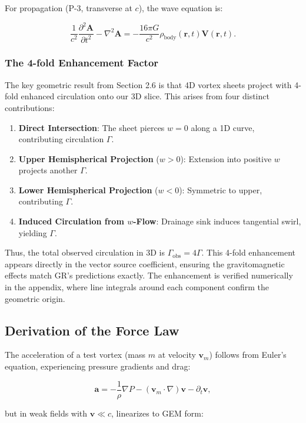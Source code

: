\documentclass{article}
\begin{document}
For propagation (P-3, transverse at \(c\)), the wave equation is:

\[
\frac{1}{c^2} \frac{\partial^2 \mathbf{A}}{\partial t^2} - \nabla^2 \mathbf{A} = -\frac{16\pi G}{c^2} \rho_{\text{body}}(\mathbf{r}, t) \mathbf{V}(\mathbf{r}, t).
\]

\subsubsection{The 4-fold Enhancement Factor}

The key geometric result from Section 2.6 is that 4D vortex sheets project with 4-fold enhanced circulation onto our 3D slice. This arises from four distinct contributions:

\begin{enumerate}
    \item \textbf{Direct Intersection}: The sheet pierces $w=0$ along a 1D curve, contributing circulation $\Gamma$.
    \item \textbf{Upper Hemispherical Projection} ($w > 0$): Extension into positive $w$ projects another $\Gamma$.
    \item \textbf{Lower Hemispherical Projection} ($w < 0$): Symmetric to upper, contributing $\Gamma$.
    \item \textbf{Induced Circulation from $w$-Flow}: Drainage sink induces tangential swirl, yielding $\Gamma$.
\end{enumerate}

Thus, the total observed circulation in 3D is $\Gamma_{\text{obs}} = 4\Gamma$. This 4-fold enhancement appears directly in the vector source coefficient, ensuring the gravitomagnetic effects match GR's predictions exactly. The enhancement is verified numerically in the appendix, where line integrals around each component confirm the geometric origin.

\subsection{Derivation of the Force Law}

The acceleration of a test vortex (mass $m$ at velocity $\mathbf{v}_m$) follows from Euler's equation, experiencing pressure gradients and drag:

\[
\mathbf{a} = -\frac{1}{\rho} \nabla P - (\mathbf{v}_m \cdot \nabla) \mathbf{v} - \partial_t \mathbf{v},
\]

but in weak fields with $\mathbf{v} \ll c$, linearizes to GEM form:
\end{document}
